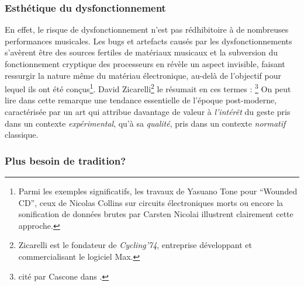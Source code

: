 	
\subsubsection{Esthétique du dysfonctionnement}

\noindent En effet, le risque de dysfonctionnement n'est pas rédhibitoire à de nombreuses performances musicales. Les bugs et artefacts causés par les dysfonctionnements s'avèrent être des sources fertiles de matériaux musicaux et la subversion du fonctionnement cryptique des processeurs en révèle un aspect invisible, faisant ressurgir la nature même du matériau électronique, au-delà de l'objectif pour lequel ils ont été conçus\footnote{Parmi les exemples significatifs, les travaux de Yasuano Tone pour ``Wounded CD'', ceux de Nicolas Collins sur circuits électroniques morts ou encore la sonification de données brutes par Carsten Nicolai illustrent clairement cette approche.}. David Zicarelli\footnote{Zicarelli est le fondateur de \textit{Cycling'74}, entreprise développant et commercialisant le logiciel Max.} le résumait en ces termes : \footnote{ cité par Cascone dans \cite{cascone_aesthetics_2000}.}
On peut lire dans cette remarque une tendance essentielle de l'époque post-moderne, caractérisée par un art qui attribue davantage de valeur à \textit{l'intérêt} du geste pris dans un contexte \textit{expérimental}, qu'à sa \textit{qualité}, pris dans un contexte \textit{normatif} classique.

\subsubsection{Plus besoin de tradition?}

